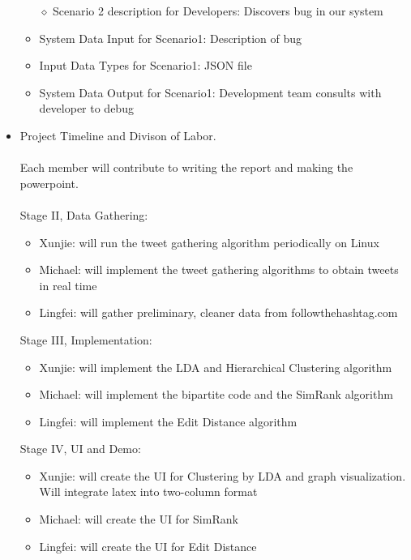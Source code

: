 \documentclass[10pt]{article}
\begin{document}
\begin{itemize}
	\begin{itemize} 
	\item[$\diamond$]{Scenario 2 description for Developers: }
	Discovers bug in our system
	\item{System Data Input for Scenario1: }
	Description of bug
	\item{Input Data Types for Scenario1: }
	JSON file
	\item{System Data Output for Scenario1: }
	Development team consults with developer to debug
	\end{itemize}
\item{Project Timeline and Divison of Labor.}
\\\\ Each member will contribute to writing the report and making the powerpoint.
\\\\ Stage II, Data Gathering:
\begin{itemize} 
\item{Xunjie: will run the tweet gathering algorithm periodically on Linux}
\item{Michael: will implement the tweet gathering algorithms to obtain tweets in real time}
\item{Lingfei: will gather preliminary, cleaner data from followthehashtag.com}
\end{itemize}
Stage III, Implementation:
\begin{itemize} 
\item{Xunjie: will implement the LDA and Hierarchical Clustering algorithm}
\item{Michael: will implement the bipartite code and the SimRank algorithm}
\item{Lingfei: will implement the Edit Distance algorithm}
\end{itemize}
Stage IV, UI and Demo:
\begin{itemize} 
\item{Xunjie: will create the UI for Clustering by LDA and graph visualization. Will integrate latex into two-column format}
\item{Michael: will create the UI for SimRank}
\item{Lingfei: will create the UI for Edit Distance}
\end{itemize}
\end{itemize}
\end{document}
